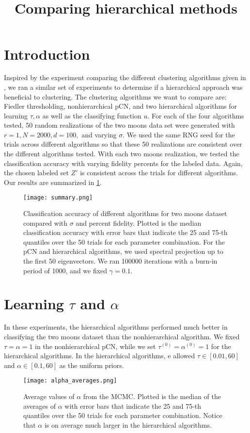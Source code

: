 \documentclass{siamart1116}
\title{Comparing hierarchical methods}
\author{\TheAuthors}
\date{}
\begin{document}
\maketitle
\setlength{\unitlength}{1in}
\setlength{\parindent}{0in}
\section{Introduction}
Inspired by the experiment comparing the different clustering algorithms given in \cite{BeLuStZy17}, we ran a similar set of experiments to determine if a hierarchical approach was beneficial to clustering. The clustering algorithms we want to compare are: Fiedler thresholding, nonhierarchical pCN, and two hierarchical algorithms for learning $\tau,\alpha$ as well as the classifying function $u$.
For each of the four algorithms tested, 50 random realizations of the two moons data set were generated with $r=1,N=2000,d=100,$ and varying $\sigma$. We used the same RNG seed for the trials across different algorithms so that these 50 realizations are consistent over the different algorithms tested. With each two moons realization, we tested the classification accuracy with varying fidelity percents for the labeled data. Again, the chosen labeled set $Z'$ is consistent across the trials for different algorithms. Our results are summarized in \cref{fig:compare_hier}.

\begin{figure}[!htb]
\label{fig:compare_hier}
\caption{Classification accuracy of different algorithms for two moons dataset compared with $\sigma$ and percent fidelity. Plotted is the median classification accuracy with error bars that indicate the 25 and 75-th quantiles over the 50 trials for each parameter combination. For the pCN and hierarchical algorithms, we used spectral projection up to the first 50 eigenvectors. We ran 100000 iterations with a burn-in period of 1000, and we fixed $\gamma = 0.1$.}
\texttt{[image: summary.png]}
\end{figure}

\section{Learning $\tau$ and $\alpha$}
In these experiments, the hierarchical algorithms performed much better in classifying the two moons dataset than the nonhierarchical algorithm. We fixed $\tau=\alpha=1$ in the nonhierarchical pCN, while we set $\tau^{(0)}=\alpha^{(0)} = 1$ for the hierarchical algorithms. In the hierarchical algorithms, e allowed $\tau \in [0.01,60]$ and $\alpha \in [0.1,60]$ as the uniform priors.
\begin{figure}[!htb]
\label{fig:compare_alpha}
\caption{Average values of $\alpha$ from the MCMC. Plotted is the median of the averages of $\alpha$ with error bars that indicate the 25 and 75-th quantiles over the 50 trials for each parameter combination. Notice that $\alpha$ is on average much larger in the hierarchical algorithms.}
\texttt{[image: alpha\_averages.png]}
\end{figure}
\end{document}

